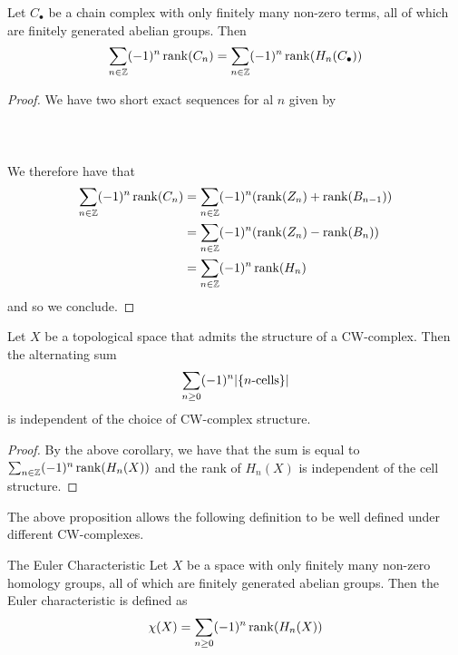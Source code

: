 \documentclass[a4paper]{article}
\begin{document}
\begin{crl}{}{} Let $C_\bullet$ be a chain complex with only finitely many non-zero terms, all of which are finitely generated abelian groups. Then $$\sum_{n\in\mathbb{Z}}(-1)^n\rank(C_n)=\sum_{n\in\mathbb{Z}}(-1)^n\rank(H_n(C_\bullet))$$ \tcbline
\begin{proof}
We have two short exact sequences for al $n$ given by \\~\\
\\~\\
We therefore have that 
\begin{align*}
\sum_{n\in\mathbb{Z}}(-1)^n\rank(C_n)&=\sum_{n\in\mathbb{Z}}(-1)^n(\rank(Z_n)+\rank(B_{n-1}))\\
&=\sum_{n\in\mathbb{Z}}(-1)^n(\rank(Z_n)-\rank(B_n))\\
&=\sum_{n\in\mathbb{Z}}(-1)^n\rank(H_n)
\end{align*}
and so we conclude. 
\end{proof}
\end{crl}

\begin{prp}{}{} Let $X$ be a topological space that admits the structure of a CW-complex. Then the alternating sum $$\sum_{n\geq 0}(-1)^n\abs{\{n\text{-cells}\}}$$ is independent of the choice of CW-complex structure. \tcbline
\begin{proof}
By the above corollary, we have that the sum is equal to $\sum_{n\in\mathbb{Z}}(-1)^n\rank(H_n(X))$ and the rank of $H_n(X)$ is independent of the cell structure. 
\end{proof}
\end{prp}

The above proposition allows the following definition to be well defined under different CW-complexes. 

\begin{defn}{The Euler Characteristic}{} Let $X$ be a space with only finitely many non-zero homology groups, all of which are finitely generated abelian groups. Then the Euler characteristic is defined as $$\chi(X)=\sum_{n\geq 0}(-1)^n\rank(H_n(X))$$
\end{defn}
\end{document}
